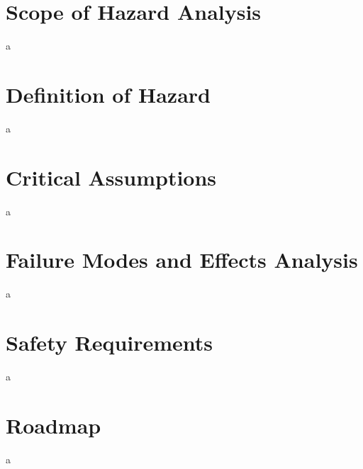 \documentclass[12pt]{article}
\begin{document}
\section{Scope of Hazard Analysis}
a

\section{Definition of Hazard}
a

\section{Critical Assumptions}
a

\section{Failure Modes and Effects Analysis}
a

\section{Safety Requirements}
a

\section{Roadmap}
a
\end{document}
